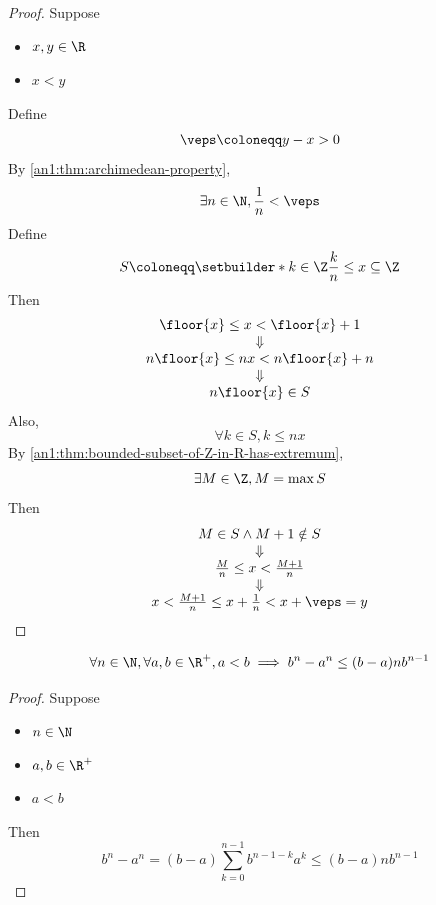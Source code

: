 \begin{proof}
  Suppose
  \begin{itemize}
    \item $x, y \in \R$
    \item $x < y$
  \end{itemize}
  Define
  \[
    \veps \coloneqq y - x > 0
  \]
  By \cref{an1:thm:archimedean-property},
  \[
    \exists n \in \N, \frac{1}{n} < \veps
  \]
  Define
  \[
    S \coloneqq \setbuilder*{k \in \Z}{\frac{k}{n} \leq x} \subseteq \Z
  \]
  Then
  \[
    \begin{array}{c}
      \floor{x} \leq x < \floor{x} + 1    \\
      \Downarrow                          \\
      n\floor{x} \leq nx < n\floor{x} + n \\
      \Downarrow                          \\
      n\floor{x} \in S
    \end{array}
  \]
  Also,
  \[
    \forall k \in S, k \leq nx
  \]
  By \cref{an1:thm:bounded-subset-of-Z-in-R-has-extremum},
  \[
    \exists M \in \Z, M = \max S
  \]
  Then
  \[
    \begin{array}{c}
      M \in S \land M + 1 \notin S         \\
      \Downarrow                           \\
      \frac{M}{n} \leq x < \frac{M + 1}{n} \\
      \Downarrow                           \\
      x < \frac{M + 1}{n} \leq x + \frac{1}{n} < x + \veps = y
    \end{array}
  \]
\end{proof}

\begin{lemma} \label{an1:lem:nth-power-is-lipschitz}
  \[
    \forall n \in \N, \forall a, b \in \R^{+}, a < b \implies b^{n} - a^{n} \leq (b - a)nb^{n - 1}
  \]
\end{lemma}

\begin{proof}
  Suppose
  \begin{itemize}
    \item $n \in \N$
    \item $a, b \in \R^{+}$
    \item $ a < b$
  \end{itemize}
  Then
  \[
    b^{n} - a^{n} = (b - a)\sum_{k = 0}^{n - 1} b^{n - 1 - k} a^{k} \leq (b - a)nb^{n - 1}
  \]
\end{proof}

